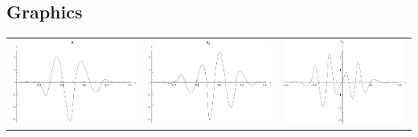 \documentclass{article}
\begin{document}
\begin{landscape}
\subsection{Graphics}
\begin{tabular}{ccc}
\includegraphics[width=6.7cm]{quintic_wavelet_1.pdf}& \includegraphics[width=6.7cm]{quintic_wavelet_2.pdf}& \includegraphics[width=6.7cm]{quintic_wavelet_3.pdf} \\

\end{tabular}
\end{landscape}
\end{document}
